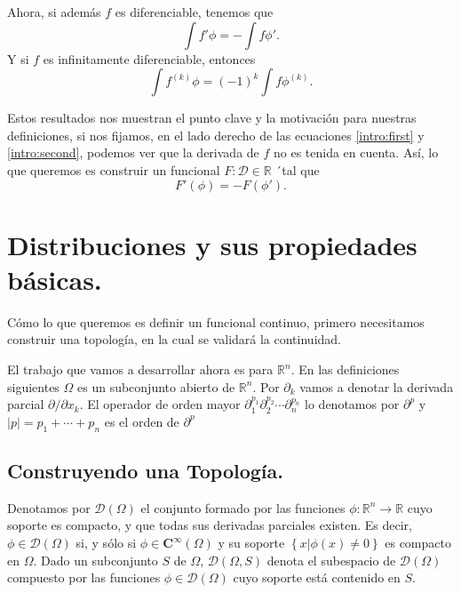 \documentclass[letter,12pt]{article}
\begin{document}
Ahora, si además $ f $ es diferenciable, tenemos que
\begin{equation}\label{intro:first}
	\int{f'\phi} = - \int{f\phi '}.
\end{equation}
Y si $ f $ es infinitamente diferenciable, entonces
\begin{equation}\label{intro:second}
	\int{f^{(k)}\phi} = (-1)^k \int{f\phi^{(k)}}.
\end{equation}

Estos resultados nos muestran el punto clave y la motivación para nuestras definiciones,
si nos fijamos, en el lado derecho de las ecuaciones \ref{intro:first} y
\ref{intro:second}, podemos ver que la derivada de $ f $ no es tenida en cuenta.
Así, lo que queremos es construir un funcional $ F: \mathscr{D} \in \mathbb{R} $ ´tal 
que
\begin{equation}\label{intro:diff}
	F'(\phi) = -F(\phi').
\end{equation}

\section{Distribuciones y sus propiedades básicas.}
Cómo lo que queremos es definir un funcional continuo, primero necesitamos construir 
una topología, en la cual se validará la continuidad.

El trabajo que vamos a desarrollar ahora es para $ \mathbb{R}^n $. En las 
definiciones siguientes $ \Omega $ es un subconjunto abierto de 
$ \mathbb{R}^n $. Por $ \partial_{k} $ vamos a denotar la derivada parcial
$ \partial/\partial{x_k} $. El operador de orden mayor 
$ \partial^{p_1}_{1} \partial^{p_2}_{2} \cdots \partial^{p_n}_{n} $ lo denotamos
por $ \partial^p $ y $ |p| = p_1 + \cdots + p_n $ es el orden de $ \partial^p $

\subsection{Construyendo una Topología.}
Denotamos por $ \mathscr{D}(\Omega) $ el conjunto formado por las funciones 
$ \phi: \mathbb{R}^n \to \mathbb{R} $ cuyo soporte es compacto, y que todas sus
derivadas parciales existen. Es decir, $ \phi \in \mathscr{D}(\Omega) $ si, y sólo si
$ \phi \in \mathbf{C}^{\infty}(\Omega) $ y su soporte 
$ \left\{ x| \phi(x) \neq 0 \right\} $ es compacto en $ \Omega $.
Dado un subconjunto $ S $ de $ \Omega $, $ \mathscr{D}(\Omega, S) $ denota el 
subespacio de $ \mathscr{D}(\Omega) $ compuesto por las funciones 
$ \phi\in\mathscr{D}(\Omega) $ cuyo soporte está contenido en $ S $.
\end{document}
